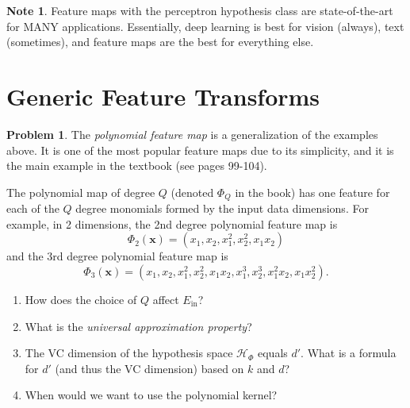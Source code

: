\documentclass[10pt]{exam}
\theoremstyle{definition}
\newtheorem{problem}{Problem}
\newtheorem{note}{Note}
\newcommand{\Ein}{E_{\text{in}}}
\newcommand{\x}{\mathbf x}
\newcommand{\HH}[1]{\mathcal H_{\text{#1}}}
\begin{document}
\vspace{6in}
\begin{note}
    Feature maps with the perceptron hypothesis class are state-of-the-art for MANY applications.
    Essentially, deep learning is best for vision (always), text (sometimes), and feature maps are the best for everything else.
\end{note}

\newpage
\section*{Generic Feature Transforms}

\begin{problem}
    The \emph{polynomial feature map} is a generalization of the examples above.
    It is one of the most popular feature maps due to its simplicity,
    and it is the main example in the textbook (see pages 99-104).

    The polynomial map of degree $Q$ (denoted $\Phi_Q$ in the book) has one feature for each of the $Q$ degree monomials formed by the input data dimensions.
    For example, in 2 dimensions, the 2nd degree polynomial feature map is
    \begin{equation}
        \Phi_2(\x) = (x_1, x_2, x_1^2, x_2^2, x_1x_2)
    \end{equation}
    and the 3rd degree polynomial feature map is
    \begin{equation}
        \Phi_3(\x) = (x_1, x_2, x_1^2, x_2^2, x_1x_2, x_1^3, x_2^3, x_1^2x_2, x_1x_2^2)
        .
    \end{equation}
    \begin{enumerate}
        \item
            How does the choice of $Q$ affect $\Ein$?
            \vspace{3in}

        \item
            What is the \emph{universal approximation property}?
            \vspace{3in}

            \newpage
        \item
        The VC dimension of the hypothesis space $\HH{$\Phi$}$ equals $d'$.
        What is a formula for $d'$ (and thus the VC dimension) based on $k$ and $d$?
            \vspace{4in}


        \item
        When would we want to use the polynomial kernel?
    \end{enumerate}
\end{problem}
\end{document}
